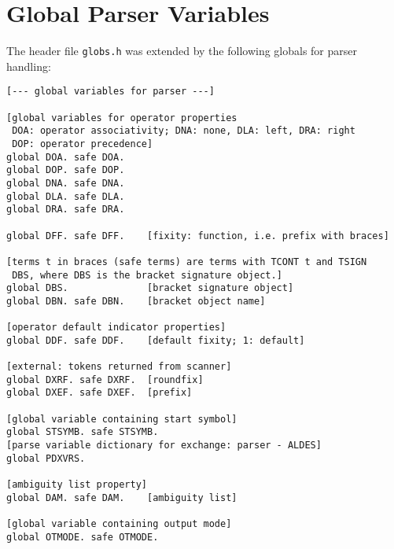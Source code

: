 \section{Global Parser Variables}
\label{globals}

The header file {\tt globs.h} was extended by the following globals
for parser handling:

\begin{verbatim}
[--- global variables for parser ---]

[global variables for operator properties
 DOA: operator associativity; DNA: none, DLA: left, DRA: right
 DOP: operator precedence]
global DOA. safe DOA.
global DOP. safe DOP.
global DNA. safe DNA.
global DLA. safe DLA.  
global DRA. safe DRA.

global DFF. safe DFF.    [fixity: function, i.e. prefix with braces]

[terms t in braces (safe terms) are terms with TCONT t and TSIGN
 DBS, where DBS is the bracket signature object.]
global DBS.              [bracket signature object]
global DBN. safe DBN.    [bracket object name]

[operator default indicator properties]
global DDF. safe DDF.    [default fixity; 1: default]

[external: tokens returned from scanner]
global DXRF. safe DXRF.  [roundfix]
global DXEF. safe DXEF.  [prefix]

[global variable containing start symbol]
global STSYMB. safe STSYMB.
[parse variable dictionary for exchange: parser - ALDES]
global PDXVRS.

[ambiguity list property]
global DAM. safe DAM.    [ambiguity list]

[global variable containing output mode]
global OTMODE. safe OTMODE.
\end{verbatim}